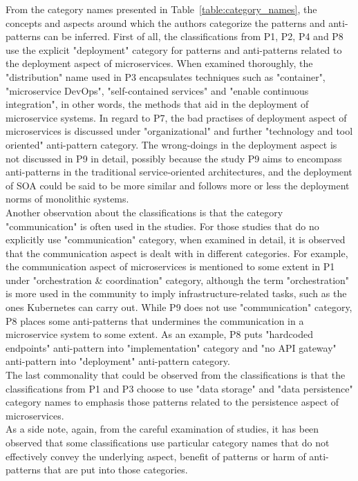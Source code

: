 \documentclass{Configuration_Files/PoliMi3i_thesis}
\begin{document}
From the category names presented in Table~\ref{table:category_names}, the concepts and aspects around which the authors categorize the patterns and anti-patterns can be inferred.
First of all, the classifications from P1, P2, P4 and P8 use the explicit "deployment" category for patterns and anti-patterns related to the deployment aspect of microservices.
When examined thoroughly, the "distribution" name used in P3 encapsulates techniques such as "container", "microservice DevOps", "self-contained services" and "enable continuous integration", in other words, the methods that aid in the deployment of microservice systems.
In regard to P7, the bad practises of deployment aspect of microservices is discussed under "organizational" and further "technology and tool oriented" anti-pattern category.
The wrong-doings in the deployment aspect is not discussed in P9 in detail, possibly because the study P9 aims to encompass anti-patterns in the traditional service-oriented architectures, and the deployment of SOA could be said to be more similar and follows more or less the deployment norms of monolithic systems.
\\
Another observation about the classifications is that the category "communication" is often used in the studies.
For those studies that do no explicitly use "communication" category, when examined in detail, it is observed that the communication aspect is dealt with in different categories.
For example, the communication aspect of microservices is mentioned to some extent in P1 under "orchestration \& coordination" category, although the term "orchestration" is more used in the community to imply infrastructure-related tasks, such as the ones Kubernetes can carry out.
While P9 does not use "communication" category, P8 places some anti-patterns that undermines the communication in a microservice system to some extent.
As an example, P8 puts "hardcoded endpoints" anti-pattern into "implementation" category and "no API gateway" anti-pattern into "deployment" anti-pattern category.
\\
The last commonality that could be observed from the classifications is that the classifications from P1 and P3 choose to use "data storage" and "data persistence" category names to emphasis those patterns related to the persistence aspect of microservices.
\\
As a side note, again, from the careful examination of studies, it has been observed that some classifications use particular category names that do not effectively convey the underlying aspect, benefit of patterns or harm of anti-patterns that are put into those categories. 
\end{document}
